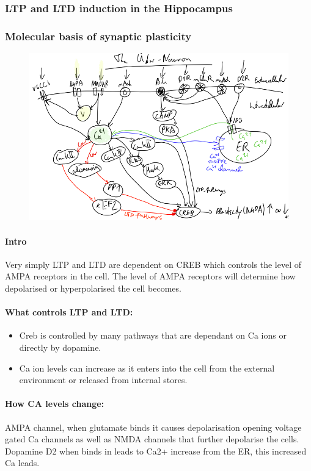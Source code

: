 \documentclass[main]{subfiles}
\begin{document}
\subsubsection{LTP and LTD induction in the Hippocampus}
\subsubsection{Molecular basis of synaptic plasticity}

\begin{figure}[H]
    \centering
    \includegraphics[width=.8\textwidth]{03_PlasticityInTheBrain/figures/pasted_image_12.png}
    \caption{}
    \label{fig:syn_plas1t}
\end{figure}

\paragraph{Intro}
Very simply LTP and LTD are dependent on CREB which controls the level of AMPA receptors in the cell. The level of AMPA receptors will determine how depolarised or hyperpolarised the cell becomes. 

\paragraph{What controls LTP and LTD:}
\begin{itemize}
    \item Creb is controlled by many pathways that are dependant on Ca ions or directly by dopamine. 
    \item Ca ion levels can increase as it enters into the cell from the external environment or released from internal stores.
\end{itemize}

\paragraph{How CA levels change:}
AMPA channel, when glutamate binds it causes depolarisation opening voltage gated Ca channels as well as NMDA channels that further depolarise the cells. 
Dopamine D2 when binds in leads to Ca2+ increase from the ER, this increased Ca leads. 
\end{document}
